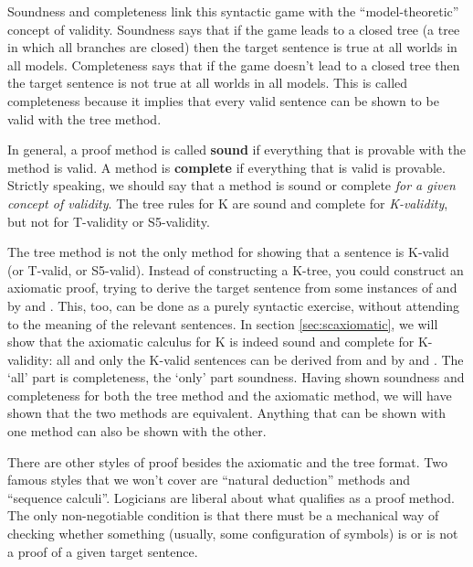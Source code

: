 Soundness and completeness link this syntactic game with the ``model-theoretic''
concept of validity. Soundness says that if the game leads to a closed tree (a
tree in which all branches are closed) then the target sentence is true at all
worlds in all models. Completeness says that if the game doesn't lead to a
closed tree then the target sentence is not true at all worlds in all models.
This is called completeness because it implies that every valid sentence can be
shown to be valid with the tree method.

In general, a proof method is called \textbf{sound} if everything that is
provable with the method is valid. A method is \textbf{complete} if everything
that is valid is provable. Strictly speaking, we should say that a method is
sound or complete \emph{for a given concept of validity}. The tree rules for K
are sound and complete for \emph{K-validity}, but not for T-validity or
S5-validity.

The tree method is not the only method for showing that a sentence is K-valid
(or T-valid, or S5-valid). Instead of constructing a K-tree, you could construct
an axiomatic proof, trying to derive the target sentence from some instances of
 and  by  and . This, too, can be done as a
purely syntactic exercise, without attending to the meaning of the relevant
sentences. In section \ref{sec:scaxiomatic}, we will show that the axiomatic
calculus for K is indeed sound and complete for K-validity: all and only the
K-valid sentences can be derived from  and  by  and
. The `all' part is completeness, the `only' part soundness. Having
shown soundness and completeness for both the tree method and the axiomatic
method, we will have shown that the two methods are equivalent. Anything that
can be shown with one method can also be shown with the other.

There are other styles of proof besides the axiomatic and the tree format. Two
famous styles that we won't cover are ``natural deduction'' methods and
``sequence calculi''. Logicians are liberal about what qualifies as a proof
method. The only non-negotiable condition is that there must be a mechanical way
of checking whether something (usually, some configuration of symbols) is or is
not a proof of a given target sentence.

